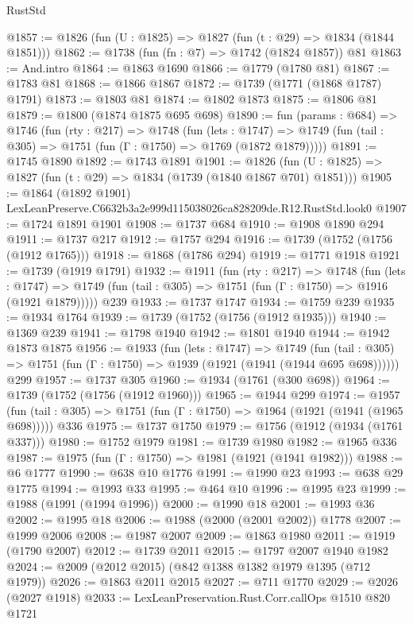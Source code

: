 \begin{lexlean}{RustStd}
\begin{coremodule}
@1857 := @1826 (fun (U : @1825) => @1827 (fun (t : @29) => @1834 (@1844 @1851)))
@1862 := @1738 (fun (fn : @7) => @1742 (@1824 @1857)) @81
@1863 := And.intro
@1864 := @1863 @1690
@1866 := @1779 (@1780 @81)
@1867 := @1783 @81
@1868 := @1866 @1867
@1872 := @1739 (@1771 (@1868 @1787) @1791)
@1873 := @1803 @81
@1874 := @1802 @1873
@1875 := @1806 @81
@1879 := @1800 (@1874 @1875 @695 @698)
@1890 := fun (params : @684) =>
  @1746
    (fun (rty : @217) =>
    @1748
      (fun (lets : @1747) =>
      @1749 (fun (tail : @305) => @1751 (fun (Γ : @1750) => @1769 (@1872 @1879)))))
@1891 := @1745 @1890
@1892 := @1743 @1891
@1901 := @1826 (fun (U : @1825) => @1827 (fun (t : @29) => @1834 (@1739 (@1840 @1867 @701) @1851)))
@1905 := @1864 (@1892 @1901) LexLeanPreserve.C6632b3a2e999d115038026ca828209de.R12.RustStd.look0
@1907 := @1724 @1891 @1901
@1908 := @1737 @684
@1910 := @1908 @1890 @294
@1911 := @1737 @217
@1912 := @1757 @294
@1916 := @1739 (@1752 (@1756 (@1912 @1765)))
@1918 := @1868 (@1786 @294)
@1919 := @1771 @1918
@1921 := @1739 (@1919 @1791)
@1932 := @1911
    (fun (rty : @217) =>
    @1748
      (fun (lets : @1747) =>
      @1749 (fun (tail : @305) => @1751 (fun (Γ : @1750) => @1916 (@1921 @1879)))))
    @239
@1933 := @1737 @1747
@1934 := @1759 @239
@1935 := @1934 @1764
@1939 := @1739 (@1752 (@1756 (@1912 @1935)))
@1940 := @1369 @239
@1941 := @1798 @1940
@1942 := @1801 @1940
@1944 := @1942 @1873 @1875
@1956 := @1933
    (fun (lets : @1747) =>
    @1749 (fun (tail : @305) => @1751 (fun (Γ : @1750) => @1939 (@1921 (@1941 (@1944 @695 @698))))))
    @299
@1957 := @1737 @305
@1960 := @1934 (@1761 (@300 @698))
@1964 := @1739 (@1752 (@1756 (@1912 @1960)))
@1965 := @1944 @299
@1974 := @1957
    (fun (tail : @305) => @1751 (fun (Γ : @1750) => @1964 (@1921 (@1941 (@1965 @698)))))
    @336
@1975 := @1737 @1750
@1979 := @1756 (@1912 (@1934 (@1761 @337)))
@1980 := @1752 @1979
@1981 := @1739 @1980
@1982 := @1965 @336
@1987 := @1975 (fun (Γ : @1750) => @1981 (@1921 (@1941 @1982)))
@1988 := @6 @1777
@1990 := @638 @10 @1776
@1991 := @1990 @23
@1993 := @638 @29 @1775
@1994 := @1993 @33
@1995 := @464 @10
@1996 := @1995 @23
@1999 := @1988 (@1991 (@1994 @1996))
@2000 := @1990 @18
@2001 := @1993 @36
@2002 := @1995 @18
@2006 := @1988 (@2000 (@2001 @2002)) @1778
@2007 := @1999 @2006
@2008 := @1987 @2007
@2009 := @1863 @1980
@2011 := @1919 (@1790 @2007)
@2012 := @1739 @2011
@2015 := @1797 @2007 @1940 @1982
@2024 := @2009 (@2012 @2015) (@842 @1388 @1382 @1979 @1395 (@712 @1979))
@2026 := @1863 @2011 @2015
@2027 := @711 @1770
@2029 := @2026 (@2027 @1918)
@2033 := LexLeanPreservation.Rust.Corr.callOps @1510 @820 @1721

\end{coremodule}
\end{lexlean}
